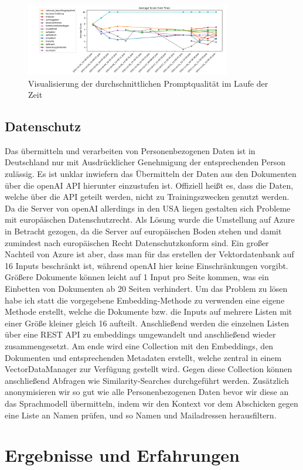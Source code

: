 \begin{figure}[H]
    \centering
    \includegraphics[width=0.8\textwidth]{figures/03_Prompt_Evaluierung.png}
    \caption{Visualisierung der durchschnittlichen Promptqualität im Laufe der Zeit}
    \label{fig:03_Prompt_Evaluierung}    %
    \end{figure}

\subsection{Datenschutz}
Das übermitteln und verarbeiten von Personenbezogenen Daten ist in Deutschland nur mit Ausdrücklicher Genehmigung der 
entsprechenden Person zulässig. Es ist unklar inwiefern das Übermitteln der Daten aus den Dokumenten über die openAI 
API hierunter einzustufen ist. Offiziell heißt es, dass die Daten, welche über die API geteilt werden, nicht zu 
Trainingszwecken genutzt werden. Da die Server von openAI allerdings in den USA liegen gestalten sich Probleme mit 
europäischen Datenschutzrecht. Als Lösung wurde die Umstellung auf Azure in Betracht gezogen, da die Server auf europäischen 
Boden stehen und damit zumindest nach europäischen Recht Datenschutzkonform sind. Ein großer Nachteil von Azure ist aber, 
dass man für das erstellen der Vektordatenbank auf 16 Inputs beschränkt ist, während openAI hier keine Einschränkungen vorgibt. 
Größere Dokumente können leicht auf 1 Input pro Seite kommen, was ein Einbetten von Dokumenten ab 20 Seiten verhindert.
Um das Problem zu lösen habe ich statt die vorgegebene Embedding-Methode zu verwenden eine eigene Methode erstellt, 
welche die Dokumente bzw. die Inputs auf mehrere Listen mit einer Größe kleiner gleich 16 aufteilt. Anschließend werden 
die einzelnen Listen über eine REST API zu embeddings umgewandelt und anschließend wieder zusammengesetzt. Am ende wird eine 
Collection mit den Embeddings, den Dokumenten und entsprechenden Metadaten erstellt, welche zentral in einem VectorDataManager 
zur Verfügung gestellt wird. Gegen diese Collection können anschließend Abfragen wie Similarity-Searches durchgeführt werden.
Zusätzlich anonymisieren wir so gut wie alle Personenbezogenen Daten bevor wir diese an das Sprachmodell übermitteln, indem 
wir den Kontext vor dem Abschicken gegen eine Liste an Namen prüfen, und so Namen und Mailadressen herausfiltern.

\section{Ergebnisse und Erfahrungen}